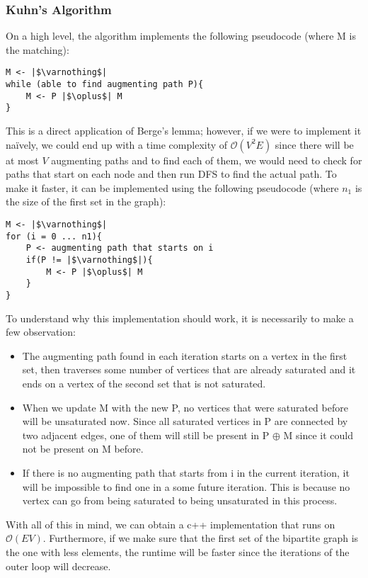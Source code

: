 \newpage
\subsubsection{Kuhn's Algorithm}
On a high level, the algorithm implements the following pseudocode 
(where M is the matching):
\begin{verbatim}
M <- |$\varnothing$|
while (able to find augmenting path P){
	M <- P |$\oplus$| M
}
\end{verbatim}
This is a direct application of Berge's lemma; however, if we were to 
implement it naïvely, we could end up with a time complexity of 
$\mathcal{O}(V^2E)$ since there will be at most $V$ augmenting paths
and to find each of them, we would need to check for paths that start 
on each node and then run DFS to find the actual path.
To make it faster, it can be implemented using the following 
pseudocode (where $n_1$ is the size of the first set in the graph):
\begin{verbatim}
M <- |$\varnothing$|
for (i = 0 ... n1){
	P <- augmenting path that starts on i
	if(P != |$\varnothing$|){
		M <- P |$\oplus$| M
	}
}
\end{verbatim}
To understand why this implementation should work, it is necessarily to
make a few observation:
\begin{itemize}
		\setlength{\itemsep}{2pt}
		\item The augmenting path found in each iteration starts on a 
				vertex in the first set, then traverses some number
				of vertices that are already saturated and it ends
				on a vertex of the second set that is not saturated.
		\item When we update M with the new P, no vertices that were
				saturated before will be unsaturated now.  Since
				all saturated vertices in P are connected by two 
				adjacent edges, one of them will still be present 
				in P $\oplus$ M since it could not be present on M before.
		\item If there is no augmenting path that starts from i in the 
				current iteration, it will be impossible to find one 
				in a some future iteration. This is because no vertex 
				can go from being saturated to being unsaturated in this
				process.
\end{itemize}
With all of this in mind, we can obtain a c++ implementation that runs on 
$\mathcal{O}(EV)$. Furthermore, if we make sure that the first set of the
bipartite graph is the one with less elements, the runtime will be faster
since the iterations of the outer loop will decrease.

